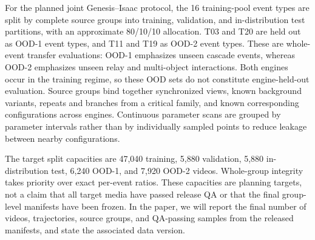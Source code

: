 For the planned joint Genesis--Isaac protocol, the 16 training-pool event
types are split by complete source groups into training, validation, and
in-distribution test partitions, with an approximate 80/10/10 allocation.
T03 and T20 are held out as OOD-1 event types, and T11 and T19 as OOD-2 event
types. These are whole-event transfer evaluations: OOD-1 emphasizes unseen
cascade events, whereas OOD-2 emphasizes unseen relay and multi-object
interactions. Both engines occur in the training regime, so these OOD sets do
not constitute engine-held-out evaluation. Source groups bind together
synchronized views, known background variants, repeats and branches from a
critical family, and known corresponding configurations across engines.
Continuous parameter scans are grouped by parameter intervals rather than by
individually sampled points to reduce leakage between nearby configurations.

The target split capacities are 47,040 training, 5,880 validation, 5,880
in-distribution test, 6,240 OOD-1, and 7,920 OOD-2 videos. Whole-group
integrity takes priority over exact per-event ratios. These capacities are
planning targets, not a claim that all target media have passed release QA or
that the final group-level manifests have been frozen. In the paper, we will
report the final number of videos, trajectories, source groups, and QA-passing
samples from the released manifests, and state the associated data version.
